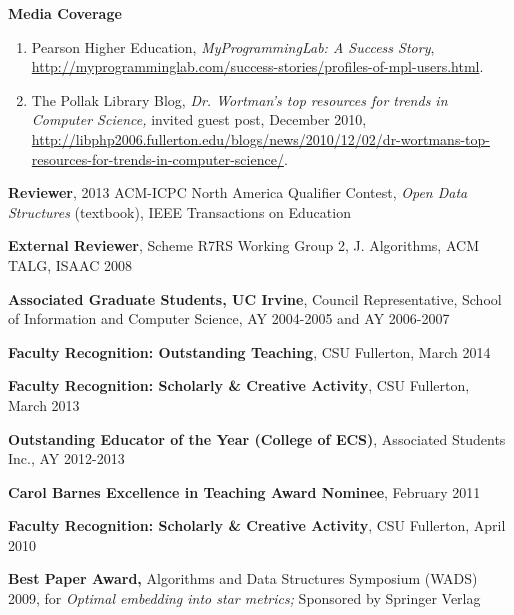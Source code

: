 \documentclass[11pt]{letter}
\begin{document}
\textbf{Media Coverage}
\begin{enumerate}
\item Pearson Higher Education, \emph{MyProgrammingLab: A Success Story}, \url{http://myprogramminglab.com/success-stories/profiles-of-mpl-users.html}.
\item The Pollak Library Blog, \emph{Dr. Wortman's top resources for trends in Computer Science,} invited guest post, December 2010, \url{http://libphp2006.fullerton.edu/blogs/news/2010/12/02/dr-wortmans-top-resources-for-trends-in-computer-science/}.
\end{enumerate}

\textbf{Reviewer}, 2013 ACM-ICPC North America Qualifier Contest, \emph{Open Data Structures} (textbook), IEEE Transactions on Education

\textbf{External Reviewer}, Scheme R7RS Working Group 2, J. Algorithms, ACM TALG, ISAAC 2008



\textbf{Associated Graduate Students, UC Irvine},  Council Representative, School of Information and Computer Science, AY 2004-2005 and AY 2006-2007 


\textbf{Faculty Recognition: Outstanding Teaching}, CSU Fullerton, March 2014

\textbf{Faculty Recognition: Scholarly \& Creative Activity}, CSU Fullerton, March 2013

\textbf{Outstanding Educator of the Year (College of ECS)}, Associated Students Inc., AY 2012-2013

\textbf{Carol Barnes Excellence in Teaching Award Nominee}, February 2011

\textbf{Faculty Recognition: Scholarly \& Creative Activity}, CSU Fullerton, April 2010

\textbf{Best Paper Award,} Algorithms and Data Structures Symposium (WADS) 2009, for \emph{Optimal embedding into star metrics;} Sponsored by Springer Verlag
\end{document}
